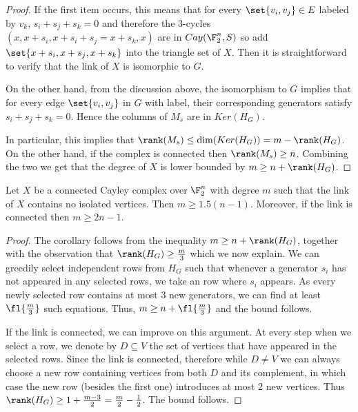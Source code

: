 \begin{proof}
    If the first item occurs, this means that for every \(\set{v_i,v_j} \in E\) labeled by \(v_k\), \(s_i+s_j+s_k = 0\) and therefore the \(3\)-cycles \((x,x+s_i,x+s_i+s_j=x+s_k,x)\) are in \(Cay(\F_2^n,S)\) so add \(\set{x+s_i,x+s_j,x+s_k}\) into the triangle set of $X$. Then it is straightforward to verify that the link of \(X\) is isomorphic to \(G\).

    On the other hand, from the discussion above, the isomorphism to \(G\) implies that for every edge \(\set{v_i,v_j}\) in $G$ with label, their corresponding generators satisfy \(s_i+s_j+s_k = 0\). Hence the columns of $M_s$ are in \(Ker(H_G)\).

    In particular, this implies that \(\rank(M_s) \leq \dim(Ker(H_G)) = m-\rank(H_G)\). On the other hand, if the complex is connected then \(\rank(M_s) \geq n\). Combining the two we get that the degree of $X$ is lower bounded by \(m \geq n+\rank(H_G)\).
\end{proof}

\begin{corollary}
    Let \(X\) be a connected Cayley complex over \(\F_2^n\) with degree \(m\) such that the link of \(X\) contains no isolated vertices. Then \(m \geq 1.5 (n-1) \). Moreover, if the link is connected then \(m \geq 2n-1\).
\end{corollary}

\begin{proof}
    The corollary follows from the inequality \(m \geq n+\rank(H_G)\), together with the observation that \(\rank(H_G) \geq \frac{m}{3}\) which we now explain. We can greedily select independent rows from \(H_G\) such that whenever a generator \(s_i\) has not appeared in any selected rows, we take an row where \(s_i\) appears. As every newly selected row contains at most \(3\) new generators, we can find at least \(\fl{\frac{m}{3}}\) such equations. Thus,
    \(m \geq n+\fl{\frac{m}{3}}\) and the bound follows.

    If the link is connected, we can improve on this argument. At every step when we select a row, we denote by \(D \subseteq V\) the set of vertices that have appeared in the selected rows. Since the link is connected, therefore while \(D\ne V\) we can always choose a new row containing vertices from both $D$ and its complement, in which case the new row (besides the first one) introduces at most \(2\) new vertices. Thus \(\rank(H_G) \geq 1+\frac{m-3}{2} = \frac{m}{2}-\frac{1}{2}\). The bound follows.
\end{proof}

